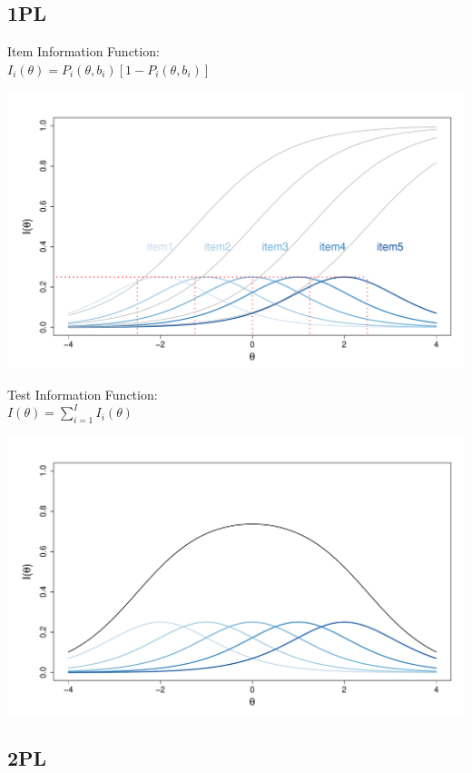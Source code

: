 \documentclass[aspectratio=149, compress]{beamer}
\begin{document}
\subsection*{1PL}

\begin{frame}
	
	\centering
	\begin{overprint}
		
		\centering
	
		\vspace*{3mm}
		
		Item Information Function:	\\
		$I_i(\theta) = P_i(\theta, b_i)[1-P_i(\theta, b_i)]$
		
		\centering
		\includegraphics[width=.80\linewidth]{img/iif-1pl.pdf}
		
		\vspace*{3mm}
		Test Information Function:	\\	$I(\theta) =  \sum_{i = 1}^{I} I_i(\theta)$
		
		\centering
		\includegraphics[width=.80\linewidth]{img/tif-1pl.pdf}
	\end{overprint}
\end{frame}

\subsection*{2PL}
\end{document}
